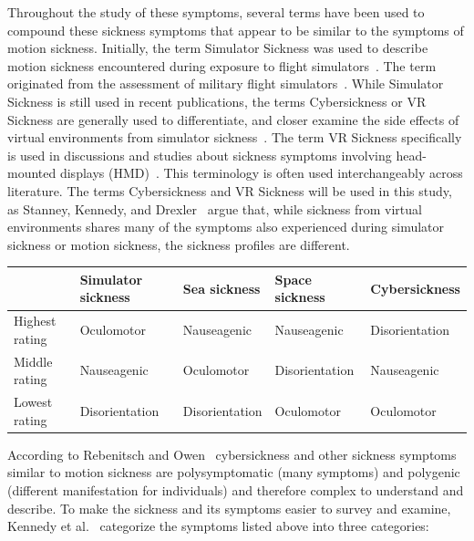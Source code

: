 Throughout the study of these symptoms, several terms have been used to compound these sickness symptoms that appear
to be similar to the symptoms of motion sickness.
Initially, the term Simulator Sickness was used to describe motion sickness encountered during exposure to flight
simulators~\cite{Saredakis2020}.
The term originated from the assessment of military flight simulators~\cite{Kennedy1993}.
While Simulator Sickness is still used in recent publications, the terms Cybersickness or VR Sickness are generally used
to differentiate, and closer examine the side effects of virtual environments from simulator
sickness~\cite{Saredakis2020,McCauley1992}.
The term VR Sickness specifically is used in discussions and studies about sickness symptoms involving head-mounted
displays (HMD)~\cite{Kim2018,Cobb1999}.
This terminology is often used interchangeably across literature.
The terms Cybersickness and VR Sickness will be used in this study, as Stanney, Kennedy, and
Drexler~\cite{Stanney1997} argue that, while sickness from virtual environments shares many of the symptoms also
experienced during simulator sickness or motion sickness, the sickness profiles are different.
\begin{center}
    \begin{tabular}{ l l l l l}
        \toprule
        \textbf{ } & \textbf{Simulator sickness} & \textbf{Sea sickness} & \textbf{Space sickness} &
        \textbf{Cybersickness} \\
        \midrule
        Highest rating & Oculomotor & Nauseagenic & Nauseagenic & Disorientation \\
        Middle rating & Nauseagenic & Oculomotor & Disorientation & Nauseagenic \\
        Lowest rating & Disorientation & Disorientation & Oculomotor & Oculomotor \\
        \bottomrule
    \end{tabular}
    \label{tab:symptom-profiles}
\end{center}
According to Rebenitsch and Owen~\cite{Rebenitsch2016} cybersickness and other sickness symptoms similar to motion
sickness are polysymptomatic (many symptoms) and polygenic (different manifestation for individuals) and therefore
complex to understand and describe.
To make the sickness and its symptoms easier to survey and examine, Kennedy et al.~\cite{Kennedy1993} categorize the
symptoms listed above into three categories:
